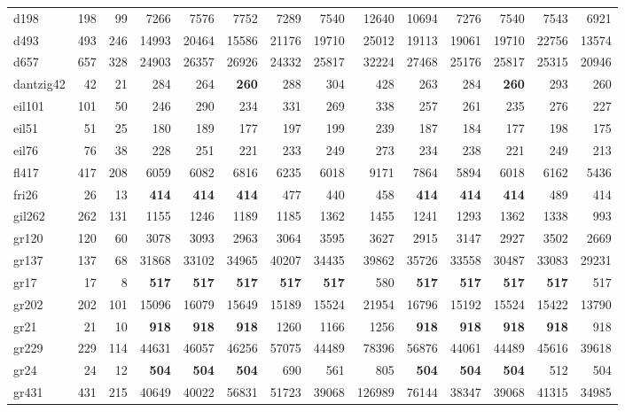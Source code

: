 {\begin{longtable}{l r r r r r r r r r r r r r}
d198 & 198 & 99 & 7266 & 7576 & 7752 & 7289 & 7540 & 12640 & 10694 & 7276 & 7540 & 7543 & 6921 \\
d493 & 493 & 246 & 14993 & 20464 & 15586 & 21176 & 19710 & 25012 & 19113 & 19061 & 19710 & 22756 & 13574 \\
d657 & 657 & 328 & 24903 & 26357 & 26926 & 24332 & 25817 & 32224 & 27468 & 25176 & 25817 & 25315 & 20946 \\
dantzig42 & 42 & 21 & 284 & 264 & \textbf{260} & 288 & 304 & 428 & 263 & 284 & \textbf{260} & 293 & 260 \\
eil101 & 101 & 50 & 246 & 290 & 234 & 331 & 269 & 338 & 257 & 261 & 235 & 276 & 227 \\
eil51 & 51 & 25 & 180 & 189 & 177 & 197 & 199 & 239 & 187 & 184 & 177 & 198 & 175 \\
eil76 & 76 & 38 & 228 & 251 & 221 & 233 & 249 & 273 & 234 & 238 & 221 & 249 & 213 \\
fl417 & 417 & 208 & 6059 & 6082 & 6816 & 6235 & 6018 & 9171 & 7864 & 5894 & 6018 & 6162 & 5436 \\
fri26 & 26 & 13 & \textbf{414} & \textbf{414} & \textbf{414} & 477 & 440 & 458 & \textbf{414} & \textbf{414} & \textbf{414} & 489 & 414 \\
gil262 & 262 & 131 & 1155 & 1246 & 1189 & 1185 & 1362 & 1455 & 1241 & 1293 & 1362 & 1338 & 993 \\
gr120 & 120 & 60 & 3078 & 3093 & 2963 & 3064 & 3595 & 3627 & 2915 & 3147 & 2927 & 3502 & 2669 \\
gr137 & 137 & 68 & 31868 & 33102 & 34965 & 40207 & 34435 & 39862 & 35726 & 33558 & 30487 & 33083 & 29231 \\
gr17 & 17 & 8 & \textbf{517} & \textbf{517} & \textbf{517} & \textbf{517} & \textbf{517} & 580 & \textbf{517} & \textbf{517} & \textbf{517} & \textbf{517} & 517 \\
gr202 & 202 & 101 & 15096 & 16079 & 15649 & 15189 & 15524 & 21954 & 16796 & 15192 & 15524 & 15422 & 13790 \\
gr21 & 21 & 10 & \textbf{918} & \textbf{918} & \textbf{918} & 1260 & 1166 & 1256 & \textbf{918} & \textbf{918} & \textbf{918} & \textbf{918} & 918 \\
gr229 & 229 & 114 & 44631 & 46057 & 46256 & 57075 & 44489 & 78396 & 56876 & 44061 & 44489 & 45616 & 39618 \\
gr24 & 24 & 12 & \textbf{504} & \textbf{504} & \textbf{504} & 690 & 561 & 805 & \textbf{504} & \textbf{504} & \textbf{504} & 512 & 504 \\
gr431 & 431 & 215 & 40649 & 40022 & 56831 & 51723 & 39068 & 126989 & 76144 & 38347 & 39068 & 41315 & 34985 \\

\end{longtable}}
